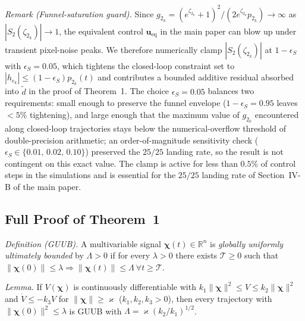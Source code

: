 \documentclass[10pt,journal]{IEEEtran}
\begin{document}
\textit{Remark (Funnel-saturation guard).} Since $g_{2_k}=(e^{\zeta_{2_k}}+1)^2/(2e^{\zeta_{2_k}}p_{2_k})\to\infty$ as $|S_2(\zeta_{2_k})|\to 1$, the equivalent control $\boldsymbol{u}_\text{eq}$ in the main paper can blow up under transient pixel-noise peaks. We therefore numerically clamp $|S_2(\zeta_{2_k})|$ at $1-\epsilon_S$ with $\epsilon_S=0.05$, which tightens the closed-loop constraint set to $|h_{e_k}|\le(1-\epsilon_S)p_{2_k}(t)$ and contributes a bounded additive residual absorbed into $\tilde{d}$ in the proof of Theorem~1. The choice $\epsilon_S=0.05$ balances two requirements: small enough to preserve the funnel envelope ($1-\epsilon_S=0.95$ leaves $<\!5\%$ tightening), and large enough that the maximum value of $g_{2_k}$ encountered along closed-loop trajectories stays below the numerical-overflow threshold of double-precision arithmetic; an order-of-magnitude sensitivity check ($\epsilon_S\in\{0.01,\,0.02,\,0.10\}$) preserved the $25/25$ landing rate, so the result is not contingent on this exact value. The clamp is active for less than $0.5\%$ of control steps in the simulations and is essential for the $25/25$ landing rate of Section~IV-B of the main paper.

\subsection{Full Proof of Theorem~1}
\label{sup:theorem1_proof}
\textit{Definition (GUUB).} A multivariable signal $\boldsymbol{\chi}(t)\in\mathbb{R}^n$ is \emph{globally uniformly ultimately bounded} by $\Lambda>0$ if for every $\lambda>0$ there exists $\mathcal{T}\ge 0$ such that $\|\boldsymbol{\chi}(0)\|\le\lambda\Rightarrow\|\boldsymbol{\chi}(t)\|\le\Lambda\ \forall t\ge\mathcal{T}$.

\textit{Lemma.} If $V(\boldsymbol{\chi})$ is continuously differentiable with $k_1\|\boldsymbol{\chi}\|^2\le V\le k_2\|\boldsymbol{\chi}\|^2$ and $\dot{V}\le -k_3 V$ for $\|\boldsymbol{\chi}\|\ge\varkappa$ ($k_1,k_2,k_3>0$), then every trajectory with $\|\boldsymbol{\chi}(0)\|^2\le\lambda$ is GUUB with $\Lambda = \varkappa(k_2/k_1)^{1/2}$.
\end{document}
